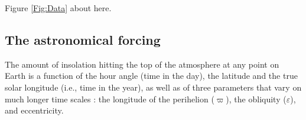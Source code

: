 \documentclass[a4paper,12pt]{article}
\newcommand{\spp}[1]{\par\medskip\noindent\fbox{\parbox{\textwidth}{\textbf{Comment by SPP}: #1 }}\medskip}
\begin{document}
\begin{center}
\begin{LARGE}
Figure \ref{Fig:Data} about here.
\end{LARGE}
\end{center}


%
%


\color{black}

\subsection{The astronomical forcing}

The amount of insolation hitting the top of the atmosphere at any point on Earth 
is a function of the hour angle (time in the day), the latitude and the true solar longitude (i.e., time in the year), 
as well as of three parameters that vary on much longer time scales : the longitude of the perihelion ($\varpi$), 
the obliquity ($\varepsilon$), and eccentricity. 
\end{document}
